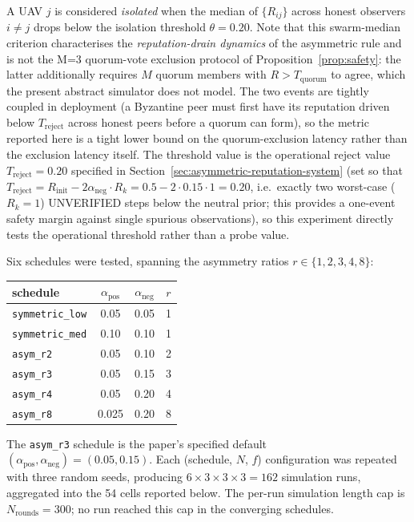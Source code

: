 \documentclass[journal,10pt,twocolumn]{IEEEtran}
\begin{document}
A UAV $j$ is considered \emph{isolated} when the median of $\{R_{ij}\}$
across honest observers $i \neq j$ drops below the isolation threshold
$\theta = 0.20$. Note that this swarm-median criterion characterises
the \emph{reputation-drain dynamics} of the asymmetric rule and is not
the M=3 quorum-vote exclusion protocol of
Proposition~\ref{prop:safety}: the latter additionally requires $M$
quorum members with $R > T_\text{quorum}$ to agree, which the present
abstract simulator does not model. The two events are tightly coupled
in deployment (a Byzantine peer must first have its reputation driven
below $T_\text{reject}$ across honest peers before a quorum can form),
so the metric reported here is a tight lower bound on the
quorum-exclusion latency rather than the exclusion latency itself. The threshold value is the operational reject value
$T_\text{reject} = 0.20$ specified in
Section~\ref{sec:asymmetric-reputation-system} (set so that
$T_\text{reject} = R_\text{init} - 2\alpha_\text{neg}\cdot R_k = 0.5 - 2\cdot 0.15 \cdot 1 = 0.20$,
i.e.\ exactly two worst-case ($R_k=1$) UNVERIFIED steps below the
neutral prior; this provides a one-event safety margin against single
spurious observations), so this experiment directly tests the
operational threshold rather than a probe value.

Six schedules were tested, spanning the asymmetry ratios
$r \in \{1, 2, 3, 4, 8\}$:
\begin{center}
\begin{tabular}{lccc}
\toprule
schedule & $\alpha_\text{pos}$ & $\alpha_\text{neg}$ & $r$ \\
\midrule
\texttt{symmetric\_low} & 0.05  & 0.05  & 1 \\
\texttt{symmetric\_med} & 0.10  & 0.10  & 1 \\
\texttt{asym\_r2}       & 0.05  & 0.10  & 2 \\
\texttt{asym\_r3}       & 0.05  & 0.15  & 3 \\
\texttt{asym\_r4}       & 0.05  & 0.20  & 4 \\
\texttt{asym\_r8}       & 0.025 & 0.20  & 8 \\
\bottomrule
\end{tabular}
\end{center}
The \texttt{asym\_r3} schedule is the paper's specified default
$(\alpha_\text{pos}, \alpha_\text{neg}) = (0.05, 0.15)$. Each
(schedule, $N$, $f$) configuration was repeated with three random
seeds, producing $6\times 3\times 3 \times 3 = 162$ simulation runs,
aggregated into the 54 cells reported below. The per-run simulation
length cap is $N_\text{rounds} = 300$; no run reached this cap in
the converging schedules.
\end{document}
